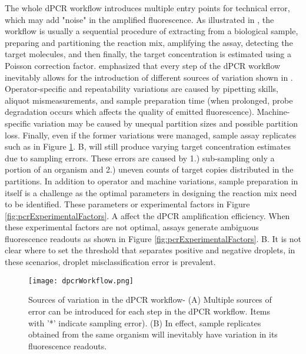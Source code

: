 The whole dPCR workflow introduces multiple entry points for technical error, which may add "noise" in the amplified fluorescence. As illustrated in , the workflow is usually a sequential procedure of extracting from a biological sample, preparing and partitioning the reaction mix, amplifying the assay, detecting the target molecules, and then finally, the target concentration is estimated using a Poisson correction factor.  emphasized that every step of the dPCR workflow inevitably allows for the introduction of different sources of variation shown in . Operator-specific and repeatability variations are caused by pipetting skills, aliquot mismeasurements, and sample preparation time (when prolonged, probe degradation occurs which affects the quality of emitted fluorescence). Machine-specific variation may be caused by unequal partition sizes and possible partition loss. Finally, even if the former variations were managed, sample assay replicates such as in Figure \ref{fig:dpcrWorkflow}. B, will still produce varying target concentration estimates due to sampling errors. These errors are caused by 1.) sub-sampling only a portion of an organism and 2.) uneven counts of target copies distributed in the partitions. In addition to operator and machine variations, sample preparation in itself is a challenge as the optimal parameters in designing the reaction mix need to be identified. These parameters or experimental factors in Figure \ref{fig:pcrExperimentalFactors}. A affect the dPCR amplification efficiency. When these experimental factors are not optimal, assays generate ambiguous fluorescence readouts as shown in Figure \ref{fig:pcrExperimentalFactors}. B. It is not clear where to set the threshold that separates positive and negative droplets, in these scenarios, droplet misclassification error is prevalent.

\begin{figure}[h]
    \centering
    \texttt{[image: dpcrWorkflow.png]}
    \caption[Sources of variation in the dPCR workflow]%
    {Sources of variation in the dPCR workflow- (A) Multiple sources of error can be introduced for each step in the dPCR workflow. Items with '*' indicate sampling error). (B) In effect, sample replicates obtained from the same organism will inevitably have variation in its fluorescence readouts. }
        \label{fig:dpcrWorkflow}
\end{figure}

